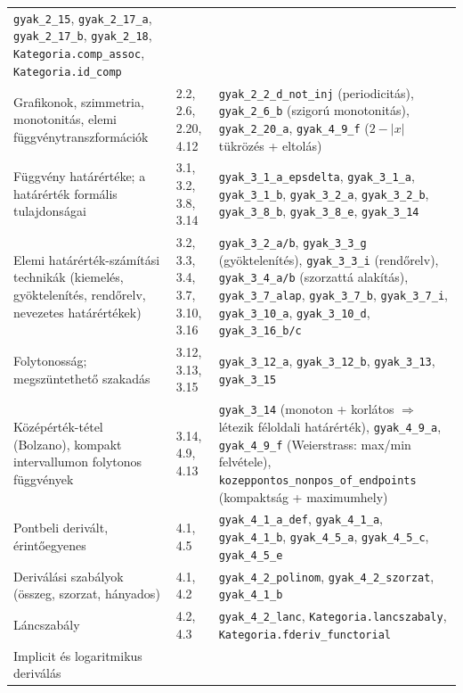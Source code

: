 \documentclass[11pt,a4paper]{article}
\newcommand{\lean}[1]{\texttt{\small #1}}
\theoremstyle{definition}
\begin{document}
\begin{longtable}{@{}p{4.4cm}p{3.0cm}p{7.4cm}@{}}
    \lean{gyak\_2\_15}, \lean{gyak\_2\_17\_a}, \lean{gyak\_2\_17\_b},
    \lean{gyak\_2\_18}, \lean{Kategoria.comp\_assoc}, \lean{Kategoria.id\_comp} \\
\addlinespace
Grafikonok, szimmetria, monotonitás, elemi függvénytranszformációk
  & 2.2, 2.6, 2.20, 4.12
  & \lean{gyak\_2\_2\_d\_not\_inj} (periodicitás), \lean{gyak\_2\_6\_b}
    (szigorú monotonitás), \lean{gyak\_2\_20\_a}, \lean{gyak\_4\_9\_f}
    ($2-|x|$ tükrözés + eltolás) \\
\addlinespace
Függvény határértéke; a határérték formális tulajdonságai
  & 3.1, 3.2, 3.8, 3.14
  & \lean{gyak\_3\_1\_a\_epsdelta}, \lean{gyak\_3\_1\_a}, \lean{gyak\_3\_1\_b},
    \lean{gyak\_3\_2\_a}, \lean{gyak\_3\_2\_b}, \lean{gyak\_3\_8\_b},
    \lean{gyak\_3\_8\_e}, \lean{gyak\_3\_14} \\
\addlinespace
Elemi határérték-számítási technikák (kiemelés, gyöktelenítés, rendőrelv, nevezetes határértékek)
  & 3.2, 3.3, 3.4, 3.7, 3.10, 3.16
  & \lean{gyak\_3\_2\_a/b}, \lean{gyak\_3\_3\_g} (gyöktelenítés),
    \lean{gyak\_3\_3\_i} (rendőrelv), \lean{gyak\_3\_4\_a/b} (szorzattá alakítás),
    \lean{gyak\_3\_7\_alap}, \lean{gyak\_3\_7\_b}, \lean{gyak\_3\_7\_i},
    \lean{gyak\_3\_10\_a}, \lean{gyak\_3\_10\_d}, \lean{gyak\_3\_16\_b/c} \\
\addlinespace
Folytonosság; megszüntethető szakadás
  & 3.12, 3.13, 3.15
  & \lean{gyak\_3\_12\_a}, \lean{gyak\_3\_12\_b}, \lean{gyak\_3\_13},
    \lean{gyak\_3\_15} \\
\addlinespace
Középérték-tétel (Bolzano), kompakt intervallumon folytonos függvények
  & 3.14, 4.9, 4.13
  & \lean{gyak\_3\_14} (monoton + korlátos $\Rightarrow$ létezik féloldali határérték),
    \lean{gyak\_4\_9\_a}, \lean{gyak\_4\_9\_f} (Weierstrass: max/min felvétele),
    \lean{kozeppontos\_nonpos\_of\_endpoints} (kompaktság + maximumhely) \\
\addlinespace
Pontbeli derivált, érintőegyenes
  & 4.1, 4.5
  & \lean{gyak\_4\_1\_a\_def}, \lean{gyak\_4\_1\_a}, \lean{gyak\_4\_1\_b},
    \lean{gyak\_4\_5\_a}, \lean{gyak\_4\_5\_c}, \lean{gyak\_4\_5\_e} \\
\addlinespace
Deriválási szabályok (összeg, szorzat, hányados)
  & 4.1, 4.2
  & \lean{gyak\_4\_2\_polinom}, \lean{gyak\_4\_2\_szorzat}, \lean{gyak\_4\_1\_b} \\
\addlinespace
Láncszabály
  & 4.2, 4.3
  & \lean{gyak\_4\_2\_lanc}, \lean{Kategoria.lancszabaly},
    \lean{Kategoria.fderiv\_functorial} \\
\addlinespace
Implicit és logaritmikus deriválás

\end{longtable}
\end{document}
